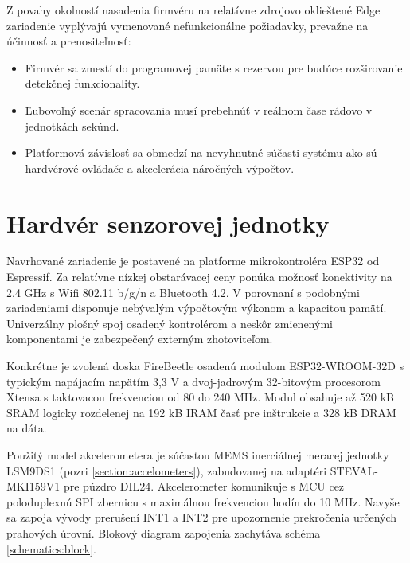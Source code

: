 Z povahy okolností nasadenia firmvéru na relatívne zdrojovo oklieštené Edge zariadenie vyplývajú
vymenované nefunkcionálne požiadavky, prevažne na účinnosť a prenositeľnosť:
\begin{itemize}[noitemsep,topsep=0pt]
\item Firmvér sa zmestí do programovej pamäte s rezervou pre budúce rozširovanie detekčnej funkcionality.
\item Ľubovoľný scenár spracovania musí prebehnúť v reálnom čase rádovo v jednotkách sekúnd.
\item Platformová závislosť sa obmedzí na nevyhnutné súčasti systému ako sú hardvérové ovládače a akcelerácia náročných výpočtov.
\end{itemize}

\section{Hardvér senzorovej jednotky}
Navrhované zariadenie je postavené na platforme mikrokontroléra ESP32 od Espressif. Za relatívne nízkej obstarávacej ceny
ponúka možnosť konektivity na 2,4 GHz s Wifi 802.11 b/g/n a Bluetooth 4.2. V porovnaní s podobnými zariadeniami disponuje
nebývalým výpočtovým výkonom a kapacitou pamätí. Univerzálny plošný spoj osadený kontrolérom a neskôr zmienenými
komponentami je zabezpečený externým zhotoviteľom.

Konkrétne je zvolená doska FireBeetle osadenú modulom ESP32-WROOM-32D s typickým napájacím napätím 3,3 V a dvoj-jadrovým
32-bitovým procesorom Xtensa s taktovacou frekvenciou od 80 do 240 MHz. Modul obsahuje až 520 kB SRAM logicky rozdelenej
na 192 kB IRAM časť pre inštrukcie a 328 kB DRAM na dáta.

Použitý model akcelerometera je súčasťou MEMS inerciálnej meracej jednotky LSM9DS1 (pozri \ref{section:accelometers}),
zabudovanej na adaptéri STEVAL-MKI159V1 pre púzdro DIL24. Akcelerometer komunikuje s MCU cez
poloduplexnú SPI zbernicu s maximálnou frekvenciou hodín do 10 MHz. Navyše sa zapoja vývody prerušení INT1 a INT2
pre upozornenie prekročenia určených prahových úrovní. Blokový diagram zapojenia zachytáva schéma \ref{schematics:block}.


